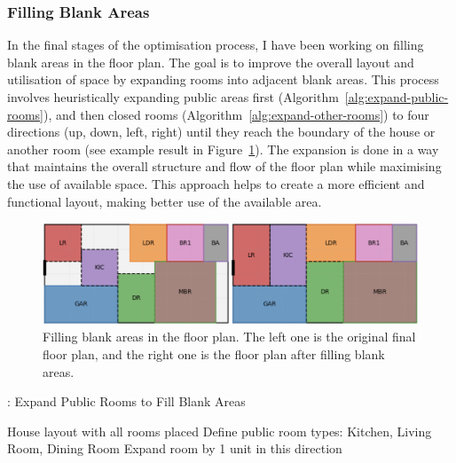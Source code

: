 \documentclass[]{article}
\begin{document}
\subsubsection{Filling Blank Areas}
In the final stages of the optimisation process, I have been working on filling blank areas in the floor plan. The goal is to improve the overall layout and utilisation of space by expanding rooms into adjacent blank areas. This process involves heuristically expanding public areas first (Algorithm~\ref{alg:expand-public-rooms}), and then closed rooms (Algorithm~\ref{alg:expand-other-rooms}) to four directions (up, down, left, right) until they reach the boundary of the house or another room (see example result in Figure~\ref{fig:fill-blank}). The expansion is done in a way that maintains the overall structure and flow of the floor plan while maximising the use of available space. This approach helps to create a more efficient and functional layout, making better use of the available area.
\begin{figure}[h]
    \centering
    \includegraphics[width=1\textwidth]{images/fill-blank.png}
    \caption{Filling blank areas in the floor plan. The left one is the original final floor plan, and the right one is the floor plan after filling blank areas.}
    \label{fig:fill-blank}
\end{figure}

\begin{algorithm}[H]
    \caption{: Expand Public Rooms to Fill Blank Areas}
    \label{alg:expand-public-rooms}
    \begin{algorithmic}[1]
        \REQUIRE House layout with all rooms placed
        \STATE Define public room types: Kitchen, Living Room, Dining Room
        \STATE Expand room by 1 unit in this direction
        \ENDWHILE
        \ENDFOR
        \ENDIF
        \ENDFOR
    \end{algorithmic}
\end{algorithm}
\end{document}
